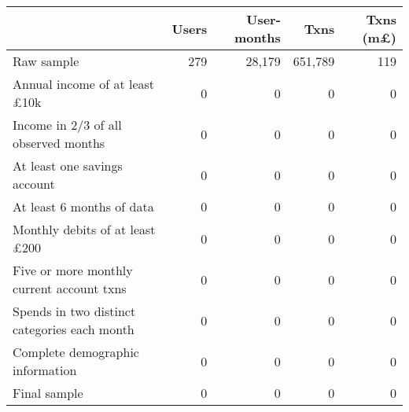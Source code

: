 \begin{tabular}{lrrrr}
\toprule
                                             & Users & User-months &    Txns & Txns (m\pounds) \\
\midrule
                                  Raw sample &   279 &      28,179 & 651,789 &             119 \\
        Annual income of at least \pounds10k &     0 &           0 &       0 &               0 \\
        Income in 2/3 of all observed months &     0 &           0 &       0 &               0 \\
                At least one savings account &     0 &           0 &       0 &               0 \\
                   At least 6 months of data &     0 &           0 &       0 &               0 \\
       Monthly debits of at least \pounds200 &     0 &           0 &       0 &               0 \\
   Five or more monthly current account txns &     0 &           0 &       0 &               0 \\
Spends in two distinct categories each month &     0 &           0 &       0 &               0 \\
            Complete demographic information &     0 &           0 &       0 &               0 \\
                                Final sample &     0 &           0 &       0 &               0 \\
\bottomrule
\end{tabular}
